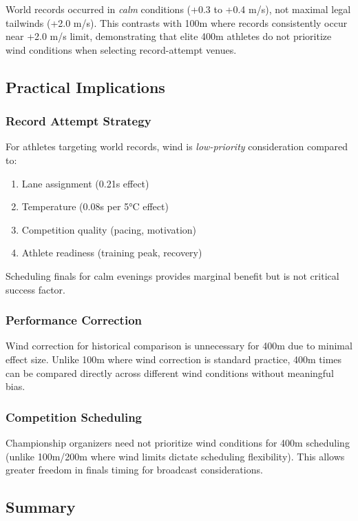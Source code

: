 World records occurred in \textit{calm} conditions (+0.3 to +0.4 m/s), not maximal legal tailwinds (+2.0 m/s). This contrasts with 100m where records consistently occur near +2.0 m/s limit, demonstrating that elite 400m athletes do not prioritize wind conditions when selecting record-attempt venues.

\subsection{Practical Implications}

\subsubsection{Record Attempt Strategy}

For athletes targeting world records, wind is \textit{low-priority} consideration compared to:
\begin{enumerate}
    \item Lane assignment (0.21s effect)
    \item Temperature (0.08s per 5°C effect)
    \item Competition quality (pacing, motivation)
    \item Athlete readiness (training peak, recovery)
\end{enumerate}

Scheduling finals for calm evenings provides marginal benefit but is not critical success factor.

\subsubsection{Performance Correction}

Wind correction for historical comparison is unnecessary for 400m due to minimal effect size. Unlike 100m where wind correction is standard practice, 400m times can be compared directly across different wind conditions without meaningful bias.

\subsubsection{Competition Scheduling}

Championship organizers need not prioritize wind conditions for 400m scheduling (unlike 100m/200m where wind limits dictate scheduling flexibility). This allows greater freedom in finals timing for broadcast considerations.

\subsection{Summary}

